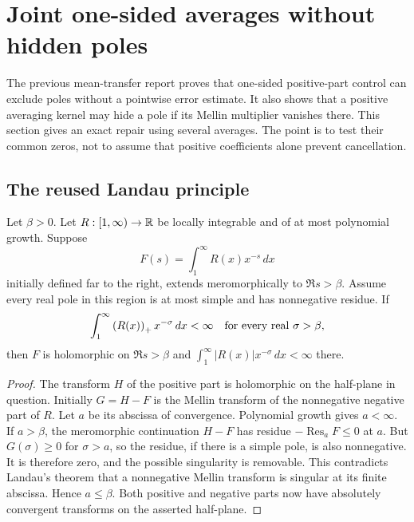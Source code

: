 \section{Joint one-sided averages without hidden poles}
\label{sec:joint-filters}

The previous mean-transfer report proves that one-sided positive-part control can exclude poles without a pointwise error estimate. It also shows that a positive averaging kernel may hide a pole if its Mellin multiplier vanishes there. This section gives an exact repair using several averages. The point is to test their common zeros, not to assume that positive coefficients alone prevent cancellation.\cite{priorMean}

\subsection{The reused Landau principle}

\begin{lemma}\label{lem:positive-mellin}
Let $\beta>0$. Let $R:[1,\infty)\to\mathbb R$ be locally integrable and of at most polynomial growth. Suppose
\[
 F(s)=\int_1^\infty R(x)x^{-s}\,dx
\]
initially defined far to the right, extends meromorphically to $\Re s>\beta$. Assume every real pole in this region is at most simple and has nonnegative residue. If
\begin{equation}\label{eq:positive-mellin-input}
 \int_1^\infty\left(R(x)\right)_{+}x^{-\sigma}\,dx<\infty
 \quad\text{for every real }\sigma>\beta,
\end{equation}
then $F$ is holomorphic on $\Re s>\beta$ and
$\int_1^\infty|R(x)|x^{-\sigma}\,dx<\infty$ there.
\end{lemma}

\begin{proof}
The transform $H$ of the positive part is holomorphic on the half-plane in question. Initially $G=H-F$ is the Mellin transform of the nonnegative negative part of $R$. Let $a$ be its abscissa of convergence. Polynomial growth gives $a<\infty$. If $a>\beta$, the meromorphic continuation $H-F$ has residue $-\operatorname{Res}_aF\le0$ at $a$. But $G(\sigma)\ge0$ for $\sigma>a$, so the residue, if there is a simple pole, is also nonnegative. It is therefore zero, and the possible singularity is removable. This contradicts Landau's theorem that a nonnegative Mellin transform is singular at its finite abscissa. Hence $a\le\beta$. Both positive and negative parts now have absolutely convergent transforms on the asserted half-plane.
\end{proof}

